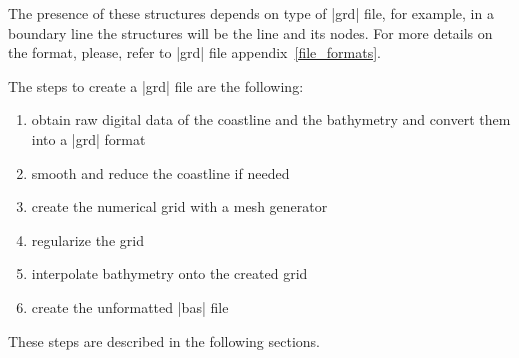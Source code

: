 The presence of these structures depends on type of |grd| file, for example,
in a boundary line the structures will be the line and its nodes.
For more details on the format, please, refer to |grd| file appendix~\ref{file_formats}.

The steps to create a |grd| file are the following:

\begin{enumerate}

\item obtain raw digital data of the coastline and the bathymetry and
  convert them into a |grd| format

\item smooth and reduce the coastline if needed

\item create the numerical grid with a mesh generator

\item regularize the grid

\item interpolate bathymetry onto the created grid

\item create the unformatted |bas| file

\end{enumerate}

These steps are described in the following sections.
